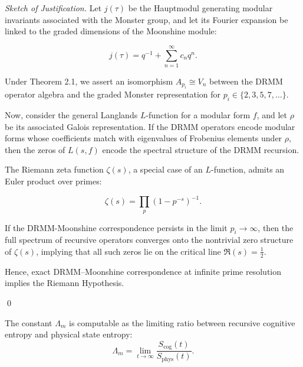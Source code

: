 \documentclass{article}
\theoremstyle{plain}
\begin{document}
\begin{proof}[Sketch of Justification]
Let \( j(\tau) \) be the Hauptmodul generating modular invariants associated with the Monster group, and let its Fourier expansion be linked to the graded dimensions of the Moonshine module:

\[
j(\tau) = q^{-1} + \sum_{n=1}^\infty c_n q^n.
\]

Under Theorem 2.1, we assert an isomorphism \( A_{p_i} \cong V_n \) between the DRMM operator algebra and the graded Monster representation for \( p_i \in \{2,3,5,7,\ldots\} \).

Now, consider the general Langlands \( L \)-function for a modular form \( f \), and let \( \rho \) be its associated Galois representation. If the DRMM operators encode modular forms whose coefficients match with eigenvalues of Frobenius elements under \( \rho \), then the zeros of \( L(s, f) \) encode the spectral structure of the DRMM recursion.

The Riemann zeta function \( \zeta(s) \), a special case of an \( L \)-function, admits an Euler product over primes:

\[
\zeta(s) = \prod_{p} \left(1 - p^{-s} \right)^{-1}.
\]

If the DRMM-Moonshine correspondence persists in the limit \( p_i \to \infty \), then the full spectrum of recursive operators converges onto the nontrivial zero structure of \( \zeta(s) \), implying that all such zeros lie on the critical line \( \Re(s) = \tfrac{1}{2} \).

Hence, exact DRMM–Moonshine correspondence at infinite prime resolution implies the Riemann Hypothesis.

\qed
\end{proof}

\begin{conjecture}
The constant \( \Lambda_m \) is computable as the limiting ratio between recursive cognitive entropy and physical state entropy:
\[
\Lambda_m = \lim_{t \to \infty} \frac{S_{\text{cog}}(t)}{S_{\text{phys}}(t)}.
\]
\end{conjecture}
\end{document}
